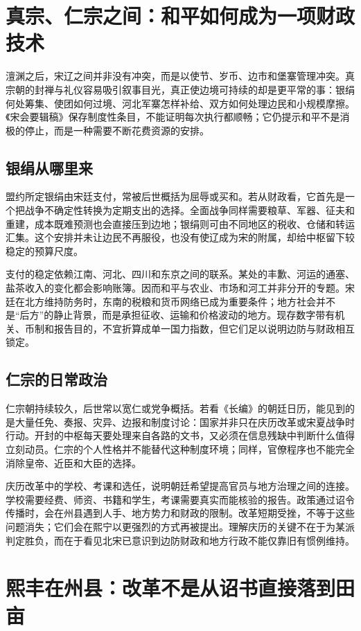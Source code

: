 \section{真宗、仁宗之间：和平如何成为一项财政技术}

澶渊之后，宋辽之间并非没有冲突，而是以使节、岁币、边市和堡寨管理冲突。真宗朝的封禅与礼仪容易吸引叙事目光，真正使边境可持续的却是更平常的事：银绢何处筹集、使团如何过境、河北军寨怎样补给、双方如何处理边民和小规模摩擦。《宋会要辑稿》保存制度性条目，不能证明每次执行都顺畅；它仍提示和平不是消极的停止，而是一种需要不断花费资源的安排。

\subsection{银绢从哪里来}

盟约所定银绢由宋廷支付，常被后世概括为屈辱或买和。若从财政看，它首先是一个把战争不确定性转换为定期支出的选择。全面战争同样需要粮草、军器、征夫和重建，成本既难预测也会直接压到边地；银绢则可由不同地区的税收、仓储和转运汇集。这个安排并未让边民不再服役，也没有使辽成为宋的附属，却给中枢留下较稳定的预算尺度。

支付的稳定依赖江南、河北、四川和东京之间的联系。某处的丰歉、河运的通塞、盐茶收入的变化都会影响账簿。因而和平与农业、市场和河工并非分开的专题。宋廷在北方维持防务时，东南的税粮和货币网络已成为重要条件；地方社会并不是“后方”的静止背景，而是承担征收、运输和价格波动的地方。现存数字带有机关、币制和报告目的，不宜折算成单一国力指数，但它们足以说明边防与财政相互锁定。

\subsection{仁宗的日常政治}

仁宗朝持续较久，后世常以宽仁或党争概括。若看《长编》的朝廷日历，能见到的是大量任免、奏报、灾异、边报和制度讨论：国家并非只在庆历改革或宋夏战争时行动。开封的中枢每天要处理来自各路的文书，又必须在信息残缺中判断什么值得立刻动员。仁宗的个人性格并不能替代这种制度环境；同样，官僚程序也不能完全消除皇帝、近臣和大臣的选择。

庆历改革中的学校、考课和选任，说明朝廷希望提高官员与地方治理之间的连接。学校需要经费、师资、书籍和学生，考课需要真实而能核验的报告。政策通过诏令传播时，会在州县遇到人手、地方势力和财政的限制。改革短期受挫，不等于这些问题消失；它们会在熙宁以更强烈的方式再被提出。理解庆历的关键不在于为某派判定胜负，而在于看见北宋已意识到边防财政和地方行政不能仅靠旧有惯例维持。

\section{熙丰在州县：改革不是从诏书直接落到田亩}

